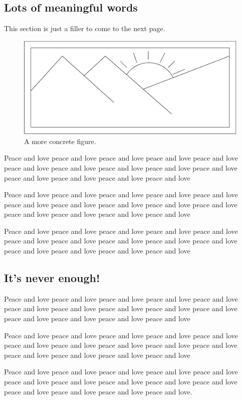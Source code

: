 \documentclass[a4paper,twoside,10pt]{fonetik}
\begin{document}
\subsection{Lots of meaningful words}
This section is just a filler to come to the next page.

\begin{figure}[!t]
\centering
\includegraphics[scale=0.6]{figures/figa.eps}
\caption{A more concrete figure.} \label{fig:concrete}
\end{figure}
Peace and love peace and love peace and love peace and love peace and
love peace and love peace and love peace and love peace and love peace
and love peace and love peace and love peace and love peace and love

Peace and love peace and love peace and love peace and love peace and
love peace and love peace and love peace and love peace and love peace
and love peace and love peace and love peace and love peace and love

Peace and love peace and love peace and love peace and love peace and
love peace and love peace and love peace and love peace and love peace
and love peace and love peace and love peace and love peace and love

\subsection{It's never enough!}
Peace and love peace and love peace and love peace and love peace and
love peace and love peace and love peace and love peace and love peace
and love peace and love peace and love peace and love peace and love

Peace and love peace and love peace and love peace and love peace and
love peace and love peace and love peace and love peace and love peace
and love peace and love peace and love peace and love peace and love

Peace and love peace and love peace and love peace and love peace and
love peace and love peace and love peace and love peace and love peace
and love peace and love peace and love peace and love peace and love.
\end{document}
